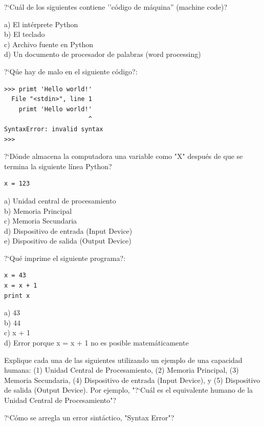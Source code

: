 \begin{ex}
?`Cu\'al de los siguientes contiene ''c\'odigo de m\'aquina'' (machine code)?

a) El int\'erprete Python\\
b) El teclado\\
c) Archivo fuente en Python\\
d) Un documento de procesador de palabras (word processing)
\end{ex}

\begin{ex}
?`Q\'ue hay de malo en el siguiente c\'odigo?:

\beforeverb
\begin{verbatim}
>>> primt 'Hello world!'
  File "<stdin>", line 1
    primt 'Hello world!'
                       ^
SyntaxError: invalid syntax
>>> 
\end{verbatim}
\afterverb

\end{ex}

\begin{ex}
?`D\'onde almacena la computadora una variable como "X" despu\'es de que  
se termina la siguiente l\'inea Python?

\beforeverb
\begin{verbatim}
x = 123
\end{verbatim}
\afterverb
%
a) Unidad central de procesamiento\\
b) Memoria Principal\\
c) Memoria Secundaria\\
d) Dispositivo de entrada (Input Device)\\
e) Dispositivo de salida (Output Device)
\end{ex}

\begin{ex}
?`Qu\'e imprime el siguiente programa?:

\beforeverb
\begin{verbatim}
x = 43
x = x + 1
print x
\end{verbatim}
\afterverb
%
a) 43\\
b) 44\\
c) x + 1\\
d) Error porque x = x + 1 no es posible matem\'aticamente
\end{ex}

\begin{ex}
Explique cada una de las siguientes utilizando un ejemplo de una capacidad humana: 
(1) Unidad Central de Procesamiento, (2) Memoria Principal, (3) Memoria Secundaria, 
(4) Dispositivo de entrada (Input Device), y 
(5) Dispositivo de salida (Output Device).
Por ejemplo, "?`Cu\'al es el equivalente humano de la Unidad Central de Procesamiento"? 
\end{ex}

\begin{ex}
?`C\'omo se arregla un error sint\'actico, "Syntax Error"?
\end{ex}
